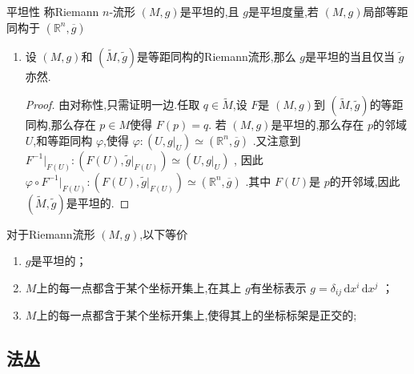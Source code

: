 \documentclass[../../几何与拓扑.tex]{subfiles}
\begin{document}
\begin{definition}{平坦性}
    称Riemann $ n $-流形 $ \left( M,g \right)  $是平坦的,且 $ g $是平坦度量,若 $ \left( M,g \right)  $局部等距同构于 $ \left( \mathbb{R} ^{n}, \overline{g} \right)  $     
\end{definition}

\begin{remark}
    \begin{enumerate}
        \item 设 $ \left( M,g \right)  $和 $ \left( \tilde{M},\tilde{g} \right)  $是等距同构的Riemann流形,那么 $ g $是平坦的当且仅当 $ \tilde{g} $亦然.    
        \begin{proof}
            由对称性,只需证明一边.任取 $ q \in  \tilde{M} $,设 $ F $是 $ \left( M,g \right)  $到 $ \left( \tilde{M},\tilde{g} \right)  $的等距同构,那么存在 $ p \in M $使得 $ F\left( p \right)  = q$.
            若 $ \left( M,g \right)  $是平坦的,那么存在 $ p $的邻域 $ U $,和等距同构 $ \varphi $,使得 $ \varphi: \left( U, g|_{U} \right)\simeq  \left( \mathbb{R} ^{n}, \overline{g} \right)   $  .又注意到 $ F^{-1} |_{F\left( U \right) }: \left( F\left( U \right), \tilde{g}|_{F\left( U \right) }  \right)\simeq  \left( U, g|_{U} \right)    $ ,
            因此 $\varphi\circ F^{-1} |_{F\left( U \right) }: \left( F\left( U \right), \tilde{g}|_{F\left( U \right) }  \right)  \simeq  \left( \mathbb{R} ^{n},\overline{g} \right) $ .其中 $ F\left( U \right)  $是 $ p $的开邻域,因此 $ \left( \tilde{M},\tilde{g} \right)  $是平坦的.   
        \end{proof}
    \end{enumerate}
    
\end{remark}

\begin{definition}
    对于Riemann流形 $ \left( M,g \right)  $,以下等价
    \begin{enumerate}
        \item $ g $是平坦的；
        \item $ M $上的每一点都含于某个坐标开集上,在其上 $ g $有坐标表示 $ g = \delta_{ij}\,\mathrm{d} x^{i}\,\mathrm{d} x^{j} $    ；
        \item $ M $上的每一点都含于某个坐标开集上,使得其上的坐标标架是正交的;
    \end{enumerate}
     
\end{definition}

\subsection{法丛}
\end{document}
